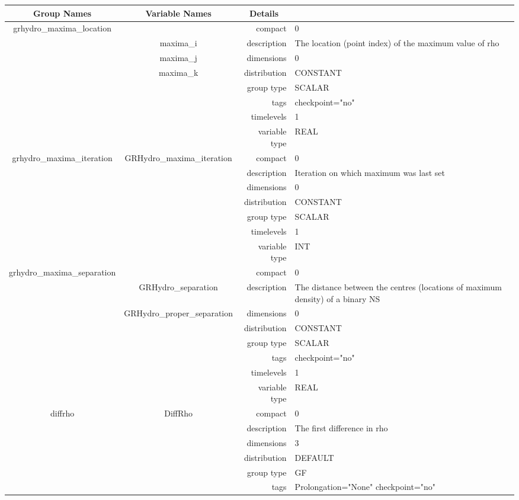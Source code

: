 \documentclass{article}
\begin{document}
\begin{tabular*}{150mm}{|c|c@{\extracolsep{\fill}}|rl|} \hline 
~ {\bf Group Names} ~ & ~ {\bf Variable Names} ~  &{\bf Details} ~ & ~ \\ 
\hline 
grhydro\_maxima\_location &  & compact & 0 \\ 
 & maxima\_i & description & The location (point index) of the maximum value of rho \\ 
 & maxima\_j & dimensions & 0 \\ 
 & maxima\_k & distribution & CONSTANT \\ 
 &  & group type & SCALAR \\ 
 &  & tags & checkpoint="no" \\ 
 &  & timelevels & 1 \\ 
 &  & variable type & REAL \\ 
\hline 
grhydro\_maxima\_iteration & GRHydro\_maxima\_iteration & compact & 0 \\ 
 &  & description & Iteration on which maximum was last set \\ 
 &  & dimensions & 0 \\ 
 &  & distribution & CONSTANT \\ 
 &  & group type & SCALAR \\ 
 &  & timelevels & 1 \\ 
 &  & variable type & INT \\ 
\hline 
grhydro\_maxima\_separation &  & compact & 0 \\ 
 & GRHydro\_separation & description & The distance between the centres (locations of maximum density) of a binary NS \\ 
 & GRHydro\_proper\_separation & dimensions & 0 \\ 
 &  & distribution & CONSTANT \\ 
 &  & group type & SCALAR \\ 
 &  & tags & checkpoint="no" \\ 
 &  & timelevels & 1 \\ 
 &  & variable type & REAL \\ 
\hline 
diffrho & DiffRho & compact & 0 \\ 
 &  & description & The first difference in rho \\ 
 &  & dimensions & 3 \\ 
 &  & distribution & DEFAULT \\ 
 &  & group type & GF \\ 
 &  & tags & Prolongation="None" checkpoint="no" \\ 

\end{tabular*}
\end{document}
